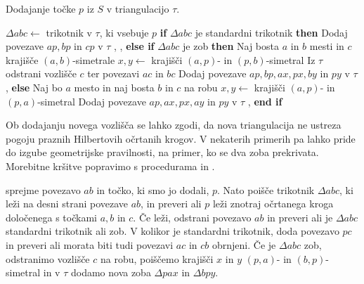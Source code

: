 \documentclass{article}
\begin{document}
\begin{algorithm}
    \caption{Dodajanje točke $p$ iz $S$ v triangulacijo $\tau$.}
    \label{alg:dodajanje}
    \begin{algorithmic}
        \State $\Delta abc \leftarrow$ trikotnik v $\tau$, ki vsebuje $p$ 
        \State \textbf{if} $\Delta abc$ je standardni trikotnik \textbf{then}
        \State \qquad Dodaj povezave $ap, bp$ in $cp$ v $\tau$
        \State \qquad {}, , 
        \State \qquad {}  
        \State \textbf{else if} $\Delta abc$ je zob \textbf{then}
        \State \qquad Naj bosta $a$ in $b$ mesti in $c$ krajišče $(a, b)$-simetrale
        \State \qquad $x, y \leftarrow$ krajišči $(a, p)$- in $(p, b)$-simetral 
        \State \qquad Iz $\tau$ odstrani vozlišče $c$ ter povezavi $ac$ in $bc$
        \State \qquad Dodaj povezave $ap, bp, ax, px, by$ in $py$ v $\tau$
        \State \qquad {}
        \State \qquad {}, 
        \State \textbf{else}
        \State \qquad Naj bo $a$ mesto in naj bosta $b$ in $c$ na robu
        \State \qquad $x, y \leftarrow$ krajišči $(a, p)$- in $(p, a)$-simetral 
        \State \qquad Dodaj povezave $ap, ax, px, ay$ in $py$ v $\tau$
        \State \qquad {}, 
        \State \textbf{end if}
    \EndProcedure
    \end{algorithmic}
\end{algorithm}

Ob dodajanju novega vozlišča se lahko zgodi, da nova triangulacija ne ustreza pogoju praznih Hilbertovih očrtanih krogov. V nekaterih primerih pa lahko pride do izgube geometrijske pravilnosti, na primer, ko se dva zoba prekrivata.
Morebitne kršitve popravimo s procedurama  in .

 sprejme povezavo $ab$ in točko, ki smo jo dodali, $p$. Nato poišče trikotnik $\Delta abc$, ki leži na desni strani povezave $ab$, in preveri ali $p$ leži znotraj očrtanega kroga določenega s točkami $a, b$ in $c$. Če leži, odstrani povezavo $ab$ in preveri ali je $\Delta abc$ standardni trikotnik ali zob.
V kolikor je standardni trikotnik, doda povezavo $pc$ in preveri ali morata biti tudi povezavi $ac$ in $cb$ obrnjeni.
Če je $\Delta abc$ zob, odstranimo vozlišče $c$ na robu, poiščemo krajišči $x$ in $y$ $(p, a)$- in $(b, p)$-simetral in v $\tau$ dodamo nova zoba $\Delta pax$ in $\Delta bpy$.
\end{document}
